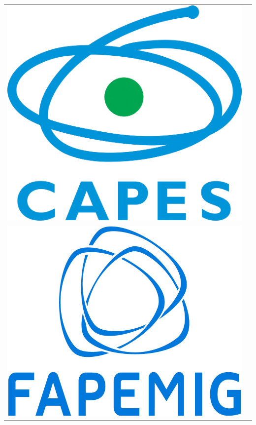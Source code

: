 \documentclass[xcolor=dvipsnames,10pt,aspectratio=169]{beamer}
\begin{document}
\begin{frame}
\begin{center}
\begin{tabular}{c c}
{				\includegraphics[trim=0.0cm 0.0cm 0.0cm 0.0cm,clip=true,height=0.2\textheight]{figuras_presentation_template/CAPES.png}}\\
				{\includegraphics[trim=0.0cm 0.0cm 0.0cm 0.0cm,clip=true,height=0.2\textheight]{figuras_presentation_template/FAPEMIG.jpg}
			}&{
}
\end{tabular}
\end{center}
\end{frame}
\end{document}
